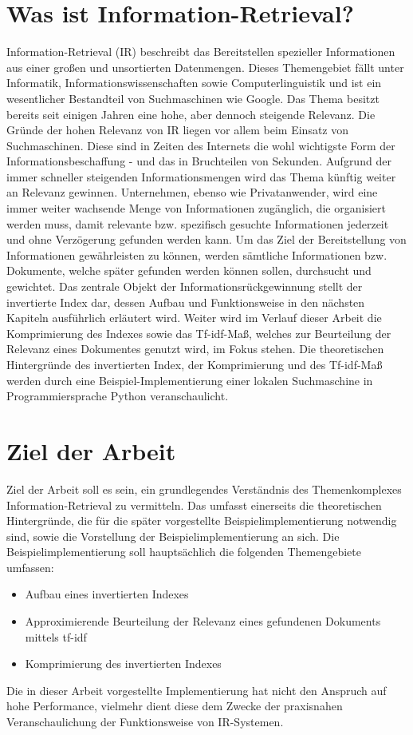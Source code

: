 \section{Was ist Information-Retrieval?}
Information-Retrieval (IR) beschreibt das Bereitstellen spezieller Informationen aus einer großen und unsortierten Datenmengen.
Dieses Themengebiet fällt unter Informatik, Informationswissenschaften sowie Computerlinguistik und ist ein wesentlicher Bestandteil von Suchmaschinen wie Google.
\newline
Das Thema besitzt bereits seit einigen Jahren eine hohe, aber dennoch steigende Relevanz. Die Gründe der hohen Relevanz von IR liegen vor allem beim Einsatz von Suchmaschinen. Diese sind in Zeiten des Internets die wohl wichtigste Form
der Informationsbeschaffung - und das in Bruchteilen von Sekunden. Aufgrund der immer schneller steigenden Informationsmengen wird das Thema künftig weiter an Relevanz gewinnen. Unternehmen, ebenso wie Privatanwender, wird eine immer weiter
wachsende Menge von Informationen zugänglich, die organisiert werden muss, damit relevante bzw. spezifisch gesuchte Informationen jederzeit und ohne Verzögerung gefunden werden kann.
\newline
Um das Ziel der Bereitstellung von Informationen gewährleisten zu können, werden sämtliche Informationen bzw. Dokumente, welche später gefunden werden können sollen, durchsucht und gewichtet.
Das zentrale Objekt der Informationsrückgewinnung stellt der invertierte Index dar, dessen Aufbau und Funktionsweise in den nächsten Kapiteln ausführlich erläutert wird.
Weiter wird im Verlauf dieser Arbeit die Komprimierung des Indexes sowie das Tf-idf-Maß, welches zur Beurteilung der Relevanz eines Dokumentes genutzt wird, im Fokus stehen.
\newline
Die theoretischen Hintergründe des invertierten Index, der Komprimierung und des Tf-idf-Maß werden durch eine Beispiel-Implementierung einer lokalen Suchmaschine in Programmiersprache Python veranschaulicht.

\section{Ziel der Arbeit}
Ziel der Arbeit soll es sein, ein grundlegendes Verständnis des Themenkomplexes Information-Retrieval zu vermitteln. Das umfasst einerseits die theoretischen Hintergründe, die für die später vorgestellte Beispielimplementierung notwendig sind, sowie die Vorstellung der Beispielimplementierung an sich.
\newline
Die Beispielimplementierung soll hauptsächlich die folgenden Themengebiete umfassen:
\newpage
\begin{itemize}
	\item Aufbau eines invertierten Indexes
	\item Approximierende Beurteilung der Relevanz eines gefundenen Dokuments mittels tf-idf
	\item Komprimierung des invertierten Indexes
\end{itemize}
Die in dieser Arbeit vorgestellte Implementierung hat nicht den Anspruch auf hohe Performance, vielmehr dient diese dem Zwecke der praxisnahen Veranschaulichung der Funktionsweise von IR-Systemen.

